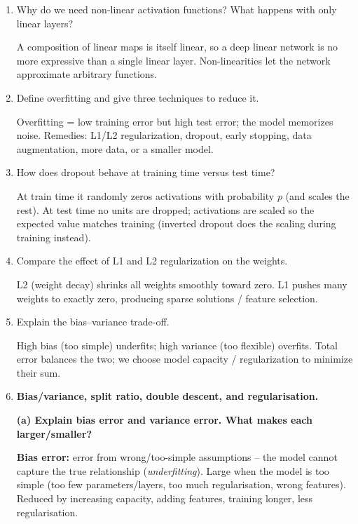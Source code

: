 \documentclass[10pt,a4paper]{article}
\newcommand{\q}[1]{\item #1}
\begin{document}
\begin{enumerate}[leftmargin=*,label=\textbf{Q\arabic*.}]

\q Why do we need non-linear activation functions? What happens with only linear layers?
\begin{answerbox}
A composition of linear maps is itself linear, so a deep linear network is no more expressive than a single linear layer. Non-linearities let the network approximate arbitrary functions.
\end{answerbox}

\q Define overfitting and give three techniques to reduce it.
\begin{answerbox}
Overfitting = low training error but high test error; the model memorizes noise. Remedies: L1/L2 regularization, dropout, early stopping, data augmentation, more data, or a smaller model.
\end{answerbox}

\q How does dropout behave at training time versus test time?
\begin{answerbox}
At train time it randomly zeros activations with probability $p$ (and scales the rest). At test time no units are dropped; activations are scaled so the expected value matches training (inverted dropout does the scaling during training instead).
\end{answerbox}

\q Compare the effect of L1 and L2 regularization on the weights.
\begin{answerbox}
L2 (weight decay) shrinks all weights smoothly toward zero. L1 pushes many weights to exactly zero, producing sparse solutions / feature selection.
\end{answerbox}

\q Explain the bias--variance trade-off.
\begin{answerbox}
High bias (too simple) underfits; high variance (too flexible) overfits. Total error balances the two; we choose model capacity / regularization to minimize their sum.
\end{answerbox}

\q \textbf{Bias/variance, split ratio, double descent, and regularisation.}

\textbf{(a) Explain bias error and variance error. What makes each larger/smaller?}
\begin{answerbox}
\textbf{Bias error:} error from wrong/too-simple assumptions -- the model cannot capture the true relationship (\emph{underfitting}). Large when the model is too simple (too few parameters/layers, too much regularisation, wrong features). Reduced by increasing capacity, adding features, training longer, less regularisation.


\end{answerbox}
\end{enumerate}
\end{document}
